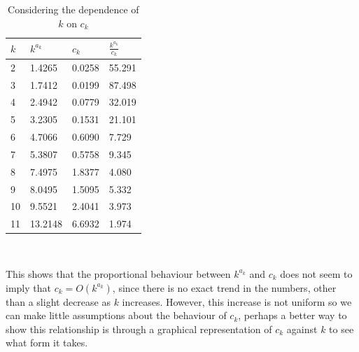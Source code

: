 \documentclass[12pt]{report}
\begin{document}
\begin{table}
\caption{Considering the dependence of $k$ on $c_{k}$} \label{uniform_dependentk}
\begin{center}
\begin{tabular}{| l | l l l |} 
\toprule
$k$ &  $k^{a_{k}}$ & $c_{k}$ & $\frac{k^{a_{k}}}{c_{k}}$ \\
\midrule[1pt]
2     &  1.4265    & 0.0258    &    55.291   \\
3     &  1.7412    & 0.0199    &    87.498   \\
4     &  2.4942    & 0.0779    &    32.019   \\
5     &  3.2305    & 0.1531    &    21.101   \\
6     &  4.7066    & 0.6090    &     7.729   \\
7     &  5.3807    & 0.5758    &     9.345   \\
8     &  7.4975    & 1.8377    &     4.080   \\
9     &  8.0495    & 1.5095    &     5.332   \\
10    &  9.5521    & 2.4041    &     3.973   \\
11    & 13.2148    & 6.6932    &     1.974   \\
\hline
\end{tabular}
\\[10pt]
\end{center}
\end{table}

This shows that the proportional behaviour between $k^{a_{k}}$ and $c_{k}$ does not seem to imply that $c_{k} = O(k^{a_{k}})$, since there is no exact trend in the numbers, other than a slight decrease as $k$ increases. However, this increase is not uniform so we can make little assumptions about the behaviour of $c_{k}$, perhaps a better way to show this relationship is through a graphical representation of $c_{k}$ against $k$ to see what form it takes.
\end{document}
